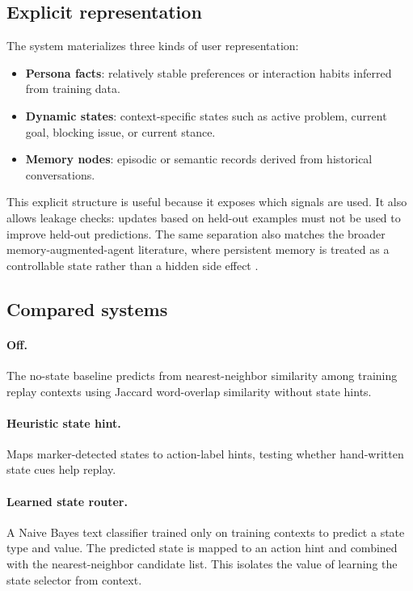 \subsection{Explicit representation}

The system materializes three kinds of user representation:
\begin{itemize}
    \item \textbf{Persona facts}: relatively stable preferences or interaction habits inferred from training data.
    \item \textbf{Dynamic states}: context-specific states such as active problem, current goal, blocking issue, or current stance.
    \item \textbf{Memory nodes}: episodic or semantic records derived from historical conversations.
\end{itemize}

This explicit structure is useful because it exposes which signals are used. It also allows leakage checks: updates based on held-out examples must not be used to improve held-out predictions.
The same separation also matches the broader memory-augmented-agent literature, where persistent memory is treated as a controllable state rather than a hidden side effect \cite{packer2023memgpt,zhang2024memorysurvey}.

\subsection{Compared systems}

\paragraph{Off.} The no-state baseline predicts from nearest-neighbor similarity among training replay contexts using Jaccard word-overlap similarity without state hints.

\paragraph{Heuristic state hint.} Maps marker-detected states to action-label hints, testing whether hand-written state cues help replay.

\paragraph{Learned state router.} A Naive Bayes text classifier trained only on training contexts to predict a state type and value. The predicted state is mapped to an action hint and combined with the nearest-neighbor candidate list. This isolates the value of learning the state selector from context.

